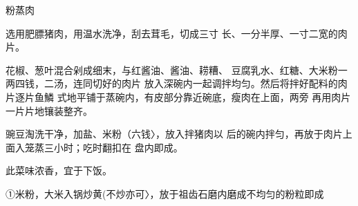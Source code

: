 \begin{recipe}{粉蒸肉}

\ingredients


\cooking

\step 	选用肥膘猪肉，用温水洗净，刮去茸毛，切成三寸 长、一分半厚、一寸二宽的肉片。

\step 	花椒、葱叶混合剁成细末，与红酱油、酱油、耢糟、 豆腐乳水、红糖、大米粉一两四钱，二汤，连同切好的肉片 放入深碗内一起调拌均匀。然后将拌好配料的肉片逐片鱼鱗 式地平铺于蒸碗内，有皮部分靠近碗底，瘦肉在上面，两旁 再用肉片一片片地镶装整齐。

\step 	豌豆淘洗干净，加盐、米粉（六钱〉，放入拌猪肉以 后的碗内拌匀，再放于肉片上面入笼蒸三小时；吃时翻扣在 盘内即成。

\notes

此菜味浓香，宜于下饭。

①米粉，大米入锅炒黄(不炒亦可〉，放于祖齿石磨内磨成不均匀的粉粒即成

\end{recipe}

